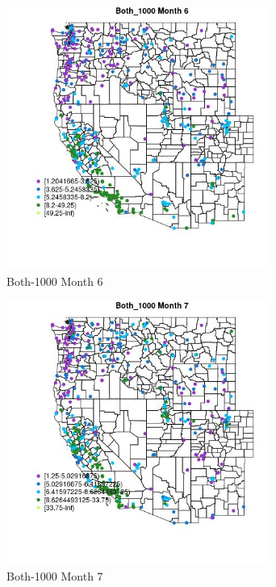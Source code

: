 \clearpage 

\begin{figure} 
\centering  
\includegraphics[width=0.77\textwidth]{Code_Outputs/ML_input_report_ML_input_PM25_Step5_part_d_de_duplicated_aves_ML_input_MapObsMo6Both_1000.jpg} 
\caption{\label{fig:ML_input_report_ML_input_PM25_Step5_part_d_de_duplicated_aves_ML_inputMapObsMo6Both_1000}Both-1000 Month 6} 
\end{figure} 
 

\begin{figure} 
\centering  
\includegraphics[width=0.77\textwidth]{Code_Outputs/ML_input_report_ML_input_PM25_Step5_part_d_de_duplicated_aves_ML_input_MapObsMo7Both_1000.jpg} 
\caption{\label{fig:ML_input_report_ML_input_PM25_Step5_part_d_de_duplicated_aves_ML_inputMapObsMo7Both_1000}Both-1000 Month 7} 
\end{figure} 
 

